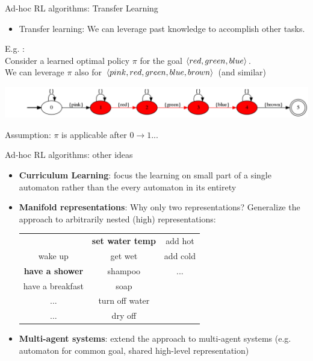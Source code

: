 \documentclass{beamer}
\begin{document}
\begin{frame}{Ad-hoc RL algorithms: Transfer Learning}
	\begin{itemize}
		\item Transfer learning: We can leverage past knowledge to accomplish other tasks.
	\end{itemize}
	E.g. \Sapientino:\\
	Consider a learned optimal policy $\pi$ for the goal $\langle red, green, blue \rangle$.\\
	We can leverage $\pi$ also for $\langle pink, red, green, blue, brown \rangle$ (and similar)
	
	\begin{center}
	\includegraphics[width=\textwidth]{images/sapientino-composite-dfa-horizontal}
	\end{center}
	
	Assumption: $\pi$ is applicable after $0 \rightarrow 1$...
\end{frame}

\begin{frame}{Ad-hoc RL algorithms: other ideas}

	\begin{itemize}
		\item \textbf{Curriculum Learning}: focus the learning on small part of a single automaton rather than the every automaton in its entirety
		\item \textbf{Manifold representations}: Why only two representations? Generalize the approach to arbitrarily nested (high) representations:
		
		\begin{table}
			\begin{tabular}{c | c | c}
				& \textbf{set water temp} 	& add hot\\
				wake up		 		      & get wet 				    & add cold\\
				\textbf{have a shower}	  & shampoo 				    & ...\\
				have a breakfast	  	  & soap 					    & \\
				...						  & turn off water 			    & \\
				...						  & dry off 				    & 
			\end{tabular}
		\end{table}
		
		\item \textbf{Multi-agent systems}: extend the approach to multi-agent systems (e.g. automaton for common goal, shared high-level representation)
	\end{itemize}
	
	
		
	
\end{frame}
	
\end{document}
